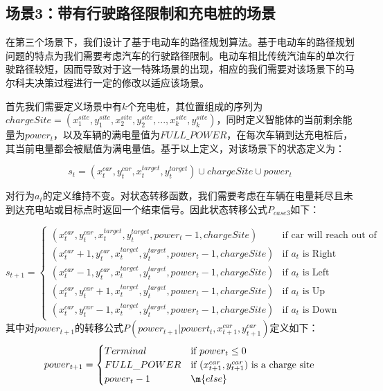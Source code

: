 \documentclass{standalone}
\begin{document}
\subsection{场景3：带有行驶路径限制和充电桩的场景}
在第三个场景下，我们设计了基于电动车的路径规划算法。基于电动车的路径规划问题的特点为我们需要考虑汽车的行驶路径限制。电动车相比传统汽油车的单次行驶路径较短，因而导致对于这一特殊场景的出现，相应的我们需要对该场景下的马尔科夫决策过程进行一定的修改以适应该场景。\par
首先我们需要定义场景中有$k$个充电桩，其位置组成的序列为$chargeSite = (x_1^{site}, y_1^{site}, x_2^{site}, y_2^{site}, ... , x_k^{site}, y_k^{site})$，同时定义智能体的当前剩余能量为$power_t$，以及车辆的满电量值为$FULL\_POWER$，在每次车辆到达充电桩后，其当前电量都会被赋值为满电量值。基于以上定义，对该场景下的状态定义为：
\begin{center}
    \begin{equation}
        s_t = (x_t^{car}, y_t^{car}, x^{target}_t, y^{target}_t) \cup chargeSite \cup power_t
    \end{equation}
\end{center}
对行为$a_t$的定义维持不变。对状态转移函数，我们需要考虑在车辆在电量耗尽且未到达充电站或目标点时返回一个结束信号。因此状态转移公式$P_{case3}$如下：
\begin{center}
    \begin{equation}
    s_{t+1} = \begin{cases}
    (x_t^{car}, y_t^{car}, x^{target}_t, y^{target}_t, power_t-1, chargeSite) &\mbox{if car will reach out of map}\\
    (x_t^{car} + 1, y_t^{car}, x^{target}_t, y^{target}_t, power_t-1, chargeSite) &\mbox{if $a_t$ is Right}\\
    (x_t^{car} - 1, y_t^{car}, x^{target}_t, y^{target}_t, power_t-1, chargeSite) &\mbox{if $a_t$ is Left}\\
    (x_t^{car}, y_t^{car} + 1, x^{target}_t, y^{target}_t, power_t-1, chargeSite) &\mbox{if $a_t$ is Up}\\
    (x_t^{car}, y_t^{car} - 1, x^{target}_t, y^{target}_t, power_t-1, chargeSite) &\mbox{if $a_t$ is Down}
    \end{cases}
    \end{equation}
    \mbox{其中对$power_{t+1}$的转移公式$P(power_{t+1}| powert_{t}, x_{t+1}^{car}, y_{t+1}^{car})$定义如下：}
    \begin{equation}
        power_{t+1} = \begin{cases}
        Terminal &\mbox{if $power_t \leq 0$}\\
        FULL\_POWER &\mbox{if $(x_{t+1}^{car}, y_{t+1}^{car})$ is a charge site}\\
        power_{t} - 1 &\m{else}
        \end{cases}
    \end{equation}
\end{center}
\end{document}
